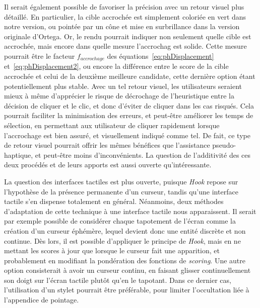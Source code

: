 	Il serait également possible de favoriser la précision avec un retour visuel plus détaillé. En particulier, la cible accrochée est simplement coloriée en vert dans notre version, ou pointée par un cône et mise en surbrillance dans la version originale d'Ortega. Or, le rendu pourrait indiquer non seulement quelle cible est accrochée, mais encore dans quelle mesure l'accrochag est solide. Cette mesure pourrait être le facteur $f_{accrochage}$ des équations~\ref{eq:phDisplacement} et~\ref{eq:phDisplacement2}, ou encore la différence entre le score de la cible accrochée et celui de la deuxième meilleure candidate, cette dernière option étant potentiellement plus stable. Avec un tel retour visuel, les utilisateurs seraient mieux à même d'apprécier le risque de décrochage de l'heuristique entre la décision de cliquer et le clic, et donc d'éviter de cliquer dans les cas risqués. Cela pourrait faciliter la minimisation des erreurs, et peut-être améliorer les temps de sélection, en permettant aux utilisateur de cliquer rapidement lorsque l'accrochage est bien assuré, et visuellement indiqué comme tel. De fait, ce type de retour visuel pourrait offrir les mêmes bénéfices que l'assistance pseudo-haptique, et peut-être moins d'inconvénients. La question de l'additivité des ces deux procédés et de leurs apports est aussi ouverte qu'intéressante.
	
	La question des interfaces tactiles est plus ouverte, puisque \emph{Hook} repose sur l'hypothèse de la présence permanente d'un curseur, tandis qu'une interface tactile s'en dispense totalement en général. Néanmoins, deux méthodes d'adaptation de cette technique à une interface tactile nous apparaissent. Il serait par exemple possible de considérer chaque tapotement de l'écran comme la création d'un curseur éphémère, lequel devient donc une entité discrète et non continue. Dès lors, il est possible d'appliquer le principe de \emph{Hook}, mais en ne mettant les scores à jour que lorsque le curseur fait une apparition, et probablement en modifiant la pondération des fonctions de \emph{scoring}. Une autre option consisterait à avoir un curseur continu, en faisant glisser continuellement son doigt sur l'écran tactile plutôt qu'en le tapotant. Dans ce dernier cas, l'utilisation d'un stylet pourrait être préférable, pour limiter l'occultation liée à l'appendice de pointage.
	
